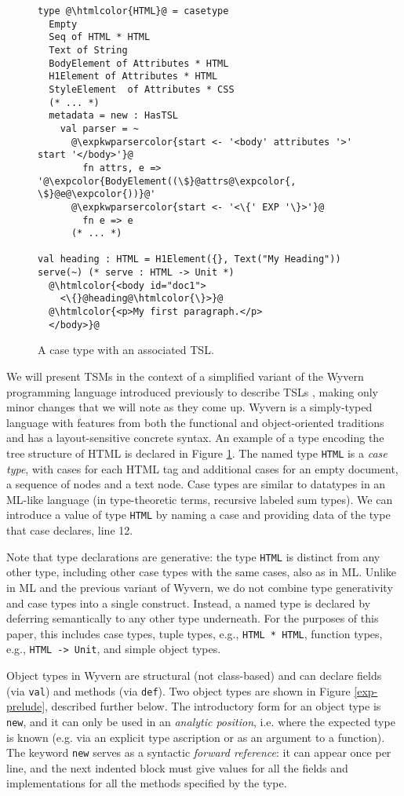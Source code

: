 \documentclass{sig-alternate}
\newcommand{\htmlcolor}[1]{\textcolor[HTML]{339933}{#1}}
\newcommand{\expkwparsercolor}[1]{\textcolor[HTML]{336699}{#1}}
\newcommand{\expcolor}[1]{\textcolor[HTML]{FF0033}{#1}}
\newcommand{\mycaption}[1]{\vspace{-4px}\caption{#1}\vspace{-2px}}
\begin{document}
\begin{figure}[t!]
\begin{lstlisting}[style=wyvern]
type @\htmlcolor{HTML}@ = casetype 
  Empty
  Seq of HTML * HTML 
  Text of String
  BodyElement of Attributes * HTML
  H1Element of Attributes * HTML
  StyleElement  of Attributes * CSS
  (* ... *)
  metadata = new : HasTSL
    val parser = ~
      @\expkwparsercolor{start <- '<body' attributes '>' start '</body>'}@
        fn attrs, e => '@\expcolor{BodyElement((\$}@attrs@\expcolor{, \$}@e@\expcolor{))}@'
      @\expkwparsercolor{start <- '<\{' EXP '\}>'}@
        fn e => e
      (* ... *)

val heading : HTML = H1Element({}, Text("My Heading"))
serve(~) (* serve : HTML -> Unit *)
  @\htmlcolor{<body id="doc1">
    <\{}@heading@\htmlcolor{\}>}@
  @\htmlcolor{<p>My first paragraph.</p>
  </body>}@
\end{lstlisting}
\mycaption{A case type with an associated TSL.}
\label{f-htmltype}
\end{figure}
We will present TSMs in the context of a simplified variant of the Wyvern programming language introduced previously to describe TSLs  \cite{TSLs}, making only minor changes that we will note as they come up. Wyvern is a simply-typed  language with features from both the functional and object-oriented traditions and has a layout-sensitive concrete syntax. An example of a type encoding the tree structure of HTML is declared in Figure \ref{f-htmltype}. The named type \verb|HTML| is a \emph{case type}, with cases for each HTML tag and additional cases for an empty document, a sequence of nodes and a text node. Case types are similar to datatypes in an ML-like language (in type-theoretic terms, recursive labeled sum types). 
We can introduce a value of type \verb|HTML| by naming a case and providing data of the type that case declares,  line 12.

Note that type declarations are generative: the type \verb|HTML| is distinct from any other type, including other case types with the same cases, also as in ML. Unlike in ML and the previous variant of Wyvern, we do not combine type generativity and case types into a single construct. Instead, a named type is declared by deferring semantically to any other type underneath. For the purposes of this paper, this includes case types, tuple types, e.g., \verb|HTML * HTML|, function types, e.g., \verb|HTML -> Unit|, and simple object types. 


Object types in Wyvern are structural (not class-based) and can declare fields (via \texttt{val}) and methods (via \texttt{def}). Two object types are shown in Figure \ref{exp-prelude}, described further below. The introductory form for an object type is \verb|new|, and it can only be used in an \emph{analytic position}, i.e. where the expected type is known (e.g. via an explicit type ascription or as an argument to a function). The keyword \verb|new| serves as a syntactic \emph{forward reference}: it can appear once per line, and the next indented block must give values for all the fields and implementations for all the methods specified by the type.
\end{document}

